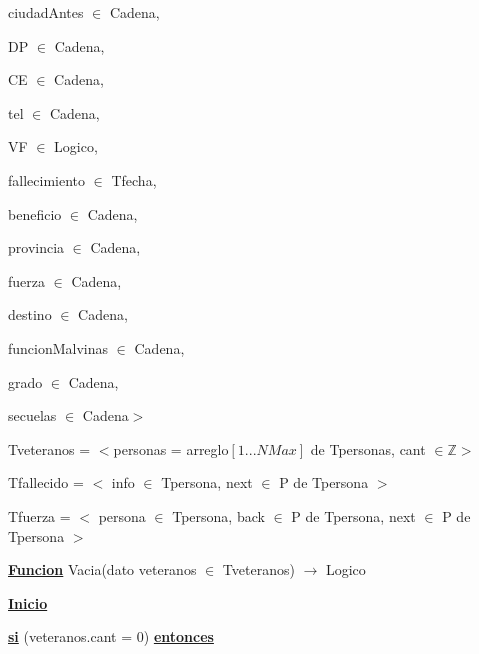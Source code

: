 \documentclass{article}
\begin{document}
        \hspace{8mm}ciudadAntes $\in$ Cadena, 
        
        \hspace{8mm}DP $\in$ Cadena, 
        
        \hspace{8mm}CE $\in$ Cadena, 
        
        \hspace{8mm}tel $\in$ Cadena, 
        
        \hspace{8mm}VF $\in$ Logico, 
        
        \hspace{8mm}fallecimiento $\in$ Tfecha,

        \hspace{8mm}beneficio $\in$ Cadena,

        \hspace{8mm}provincia $\in$ Cadena,

        \hspace{8mm}fuerza $\in$ Cadena,

        \hspace{8mm}destino $\in$ Cadena,

        \hspace{8mm}funcionMalvinas $\in$ Cadena,

        \hspace{8mm}grado $\in$ Cadena,

        \hspace{8mm}secuelas $\in$ Cadena$>$

    \hspace{4mm}Tveteranos = $<$personas = arreglo$[1...NMax]$ de Tpersonas, cant $\in \mathbb{Z}$$>$

    \hspace{4mm}Tfallecido = $<$ info $\in$ Tpersona, next $\in$ P de Tpersona $>$

    \hspace{4mm}Tfuerza = $<$ persona $\in$ Tpersona, back $\in$ P de Tpersona, next $\in$ P de Tpersona $>$

    \vspace{4mm}

    \hspace{4mm}\underline{\textbf{Funcion}} Vacia(dato veteranos $\in$ Tveteranos) $\rightarrow$ Logico

        \hspace{8mm}\underline{\textbf{Inicio}}

            \hspace{12mm}\underline{\textbf{si}} (veteranos.cant = 0) \underline{\textbf{entonces}}
\end{document}
